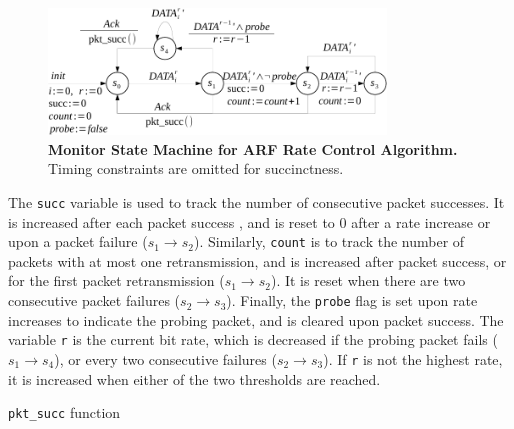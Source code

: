 
\begin{figure}[h!]
  \centering
  \includegraphics[width=0.8\textwidth]{./figures/arf_sm.pdf}
  \caption{\textbf{Monitor State Machine for ARF Rate Control Algorithm.} Timing
  constraints are omitted for succinctness.}
  \label{fig:arf_sm}
\end{figure}


The \texttt{succ} variable is used to track the number of consecutive packet
successes. It is increased after each packet success , and is reset to 0 after a
rate increase or upon a packet failure ($s_1\rightarrow s_2$).  Similarly,
\texttt{count} is to track the number of packets with at most one
retransmission, and is increased after packet success, or for the first packet
retransmission ($s_1\rightarrow s_2$). It is reset when there are two
consecutive packet failures ($s_2\rightarrow s_3$). Finally, the \texttt{probe}
flag is set upon rate increases to indicate the probing packet, and is cleared
upon packet success. The variable \texttt{r} is the current bit rate, which is
decreased if the probing packet fails ($s_1\rightarrow s_4$), or every two
consecutive failures ($s_2\rightarrow s_3$). If \texttt{r} is not the highest
rate, it is increased when either of the two thresholds are reached.


\begin{algorithm}[t!]
  \caption{\texttt{pkt\_succ} function}
  \label{alg:pkt_succ}
  \begin{algorithmic}[1]
    \EndIf
    \EndFunction
  \end{algorithmic}
\end{algorithm}

